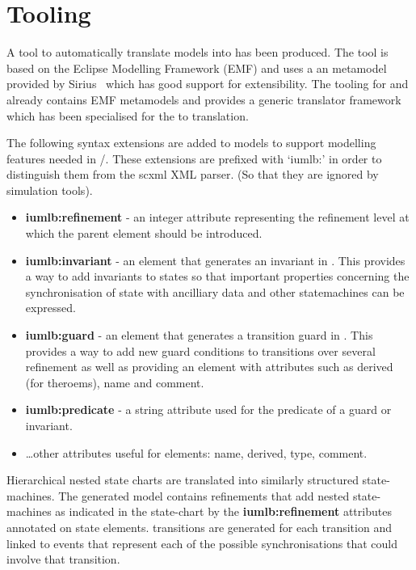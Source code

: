 
\section{Tooling}
\label{sec:tooling}

A tool to automatically translate \SCXML models into \iUMLB has been produced. The tool is based on the Eclipse Modelling Framework (EMF) and uses a an \SCXML metamodel provided by Sirius~\cite{siriuswebsite} which has good support for extensibility. The tooling for \iUMLB and \EventB already contains EMF metamodels and provides a generic translator framework which has been specialised for the \SCXML to \iUMLB translation.  
 
The following syntax extensions are added to \SCXML models to support modelling features needed in \iUMLB/\EventB. These extensions are prefixed with `iumlb:' in order to distinguish them from the scxml XML parser. (So that they are ignored by \SCXML simulation tools). 
\begin{itemize}
	\item \textbf{iumlb:refinement} - an integer attribute representing the refinement level at which the parent element should be introduced.
	\item \textbf{iumlb:invariant} - an element that generates an invariant in \iUMLB. This provides a way to add invariants to states so that important properties concerning the synchronisation of state with ancilliary data and other statemachines can be expressed.
	\item \textbf{iumlb:guard} - an element that generates a transition guard in \iUMLB. 
	This provides a way to add new guard conditions to transitions over several refinement as well as providing an element with attributes such as derived (for \EventB theroems), name and comment.
	\item \textbf{iumlb:predicate} - a string attribute used for the predicate of a guard or invariant.
	\item \ldots other attributes useful for \iUMLB elements: name, derived, type, comment.
\end{itemize}

Hierarchical nested state charts are translated into similarly structured \iUMLB state-machines. The generated \iUMLB model contains refinements that add nested state-machines as indicated in the  \SCXML state-chart by the \textbf{iumlb:refinement} attributes annotated on state elements. \iUMLB transitions are generated for each \SCXML transition and linked to \EventB events that represent each of the possible synchronisations that could involve that transition.



